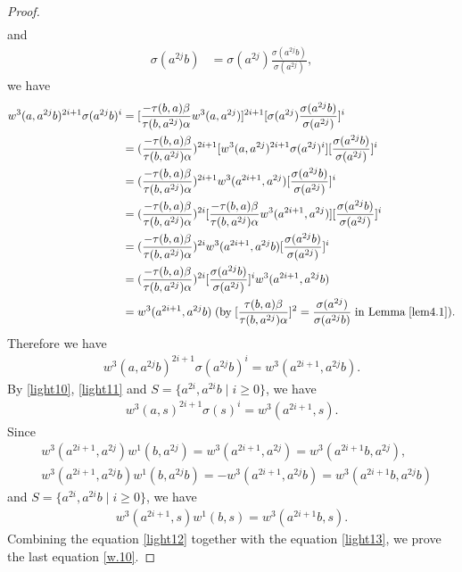 \documentclass[a4paper,11pt]{amsart}
\numberwithin{equation}{section}
\begin{document}
\begin{proof}
\begin{align*}
\end{align*}
and
\begin{align*}
\sigma(a^{2j}b)&=\sigma(a^{2j}) \frac{\sigma(a^{2j}b)}{\sigma(a^{2j})},
\end{align*}
we have
\begin{align*}
w^3(a,a^{2j}b)^{2i+1} \sigma(a^{2j}b)^i&=[\frac{-\tau(b,a)\beta}{\tau(b,a^{2j}) \alpha} w^3(a,a^{2j})]^{2i+1} [\sigma(a^{2j}) \frac{\sigma(a^{2j}b)}{\sigma(a^{2j})}]^{i}\\
&=(\frac{-\tau(b,a)\beta}{\tau(b,a^{2j}) \alpha})^{2i+1} [w^3(a,a^{2j})^{2i+1} \sigma(a^{2j})^i] [\frac{\sigma(a^{2j}b)}{\sigma(a^{2j})}]^{i}\\
&=(\frac{-\tau(b,a)\beta}{\tau(b,a^{2j}) \alpha})^{2i+1} w^3(a^{2i+1},a^{2j}) [\frac{\sigma(a^{2j}b)}{\sigma(a^{2j})}]^{i}\\
&=(\frac{-\tau(b,a)\beta}{\tau(b,a^{2j}) \alpha})^{2i} [\frac{-\tau(b,a)\beta}{\tau(b,a^{2j}) \alpha} w^3(a^{2i+1},a^{2j})] [\frac{\sigma(a^{2j}b)}{\sigma(a^{2j})}]^{i}\\
&=(\frac{-\tau(b,a)\beta}{\tau(b,a^{2j}) \alpha})^{2i} w^3(a^{2i+1},a^{2j}b) [\frac{\sigma(a^{2j}b)}{\sigma(a^{2j})}]^{i}\\
&=(\frac{-\tau(b,a)\beta}{\tau(b,a^{2j}) \alpha})^{2i}  [\frac{\sigma(a^{2j}b)}{\sigma(a^{2j})}]^{i} w^3(a^{2i+1},a^{2j}b)\\
&=w^3(a^{2i+1},a^{2j}b)\;(\text{by} \;[\frac{\tau(b,a)\beta}{\tau(b,a^{2j})\alpha}]^2=
\frac{\sigma(a^{2j})}{\sigma(a^{2j}b)}\;\text{in Lemma}\; \ref{lem4.1}).
\end{align*}
Therefore we have
\begin{align}
\label{light11} w^3(a,a^{2j}b)^{2i+1} \sigma(a^{2j}b)^i=w^3(a^{2i+1},a^{2j}b).
\end{align}
By \eqref{light10}, \eqref{light11} and $S=\{a^{2i},a^{2i}b\;|\;i\geq 0\}$,  we have
\begin{align}
\label{light12} w^3(a,s)^{2i+1} \sigma(s)^i=w^3(a^{2i+1},s).
\end{align}
Since
\begin{align*}
&w^3(a^{2i+1},a^{2j}) w^1(b,a^{2j})=w^3(a^{2i+1},a^{2j})=w^3(a^{2i+1}b,a^{2j}),\\
&w^3(a^{2i+1},a^{2j}b) w^1(b,a^{2j}b)=-w^3(a^{2i+1},a^{2j}b)=w^3(a^{2i+1}b,a^{2j}b)
\end{align*}
and $S=\{a^{2i},a^{2i}b\;|\;i\geq 0\}$, we have
\begin{align}
\label{light13} w^3(a^{2i+1},s) w^1(b,s)=w^3(a^{2i+1}b,s).
\end{align}
 Combining the equation \eqref{light12} together with the equation \eqref{light13}, we prove the last equation \eqref{w.10}.
\end{proof}
\end{document}

